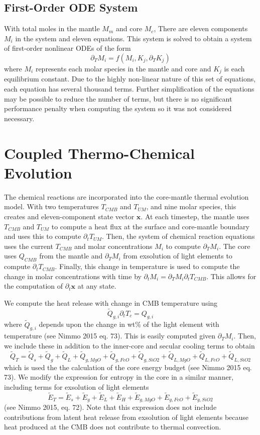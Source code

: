 \documentclass[]{article}
\begin{document}
	\subsection{First-Order ODE System} \label{solution}
	
	With total moles in the mantle \(M_m\) and core \(M_c\), There are
	eleven components \(M_i\) in the system and eleven equations. This
	system is solved to obtain a system of first-order nonlinear ODEs of the
	form 
	$$\partial_T M_i = f(M_i, K_j, \partial_T K_j)$$
	where \(M_i\) represents each molar species in the mantle and core and \(K_j\) is each equilibrium constant. Due to the highly non-linear nature of this set of equations, each equation has several thousand terms. Further simplification of the equations may be possible to reduce the number of terms, but there is no significant performance penalty when computing the system so it was not considered necessary. 
	
	\section{Coupled Thermo-Chemical Evolution} \label{coupled-thermo-chemical-evolution}
	
	The chemical reactions are incorporated into the core-mantle thermal
	evolution model. With two temperatures \(T_{CMB}\) and \(T_{UM}\), and
	nine molar species, this creates and eleven-component state vector
	\(\mathbf{x}\). At each timestep, the mantle uses \(T_{CMB}\) and
	\(T_{UM}\) to compute a heat flux at the surface and core-mantle
	boundary and uses this to compute \(\partial_t T_{UM}\). Then, the
	system of chemical reaction equations uses the current \(T_{CMB}\) and
	molar concentrations \(M_i\) to compute \(\partial_T M_i\). The core
	uses \(Q_{CMB}\) from the mantle and \(\partial_T M_i\) from exsolution
	of light elements to compute \(\partial_t T_{CMB}\). Finally, this
	change in temperature is used to compute the change in molar
	concentrations with time by
	\(\partial_t M_i = \partial_T M_i \partial_t T_{CMB}\). This allows
	for the computation of \(\partial_t \mathbf{x}\) at any state.
	
	We compute the heat release with change in CMB temperature using
	$$\tilde{Q}_{g,i} \partial_t T_c = Q_{g,i}$$ 
	where \(\tilde{Q}_{g,i}\) depends upon the change in wt\% of the light element with temperature (see Nimmo 2015 eq. 73). This is easily computed given \(\partial_T M_i\). Then, we include these in addition to the inner-core and secular cooling terms to obtain
	$$\tilde{Q}_T = \tilde{Q}_s+\tilde{Q}_g+\tilde{Q}_L +\tilde{Q}_{g,MgO}+\tilde{Q}_{g,FeO}+\tilde{Q}_{g,SiO2}+\tilde{Q}_{L,MgO}+\tilde{Q}_{L,FeO}+\tilde{Q}_{L,SiO2}$$
	which is used the the calculation of the core energy budget (see Nimmo
	2015 eq. 73). We modify the expression for entropy in the core in a similar manner, including terms for exsolution of light elements
	$$\tilde{E}_T = \tilde{E}_s+\tilde{E}_g+\tilde{E}_L+\tilde{E}_H +\tilde{E}_{g,MgO}+\tilde{E}_{g,FeO}+\tilde{E}_{g,SiO2}$$
	(see Nimmo 2015, eq. 72). Note that this expression does not include contributions from latent heat release from exsolution of light elements because heat produced at the CMB does not contribute to thermal convection.
	
\end{document}
